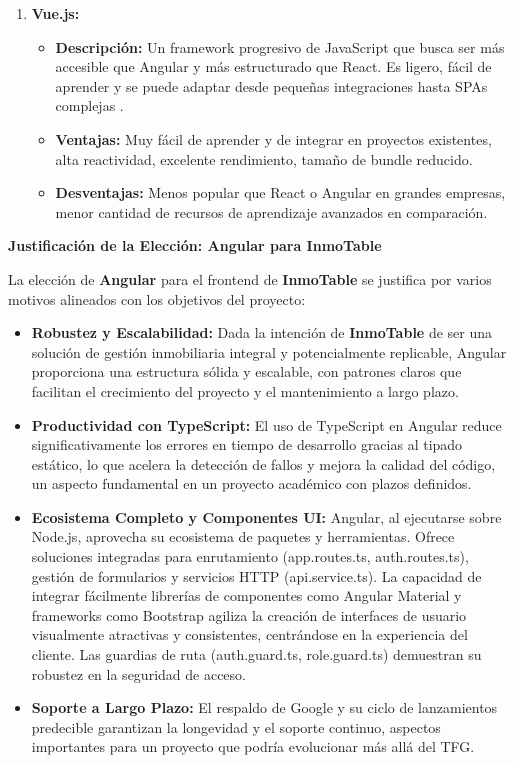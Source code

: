 \begin{enumerate}
    \item \textbf{Vue.js:}
    \begin{itemize}
        \item \textbf{Descripción:} Un framework progresivo de JavaScript que busca ser más accesible que Angular y más estructurado que React. Es ligero, fácil de aprender y se puede adaptar desde pequeñas integraciones hasta SPAs complejas \cite{hiberus2024angular}.
        \item \textbf{Ventajas:} Muy fácil de aprender y de integrar en proyectos existentes, alta reactividad, excelente rendimiento, tamaño de bundle reducido.
        \item \textbf{Desventajas:} Menos popular que React o Angular en grandes empresas, menor cantidad de recursos de aprendizaje avanzados en comparación.
    \end{itemize}

\end{enumerate}

\textbf{Justificación de la Elección: Angular para InmoTable}

La elección de \textbf{Angular} para el frontend de \textbf{InmoTable} se justifica por varios motivos alineados con los objetivos del proyecto:

\begin{itemize}
    \item \textbf{Robustez y Escalabilidad:} Dada la intención de \textbf{InmoTable} de ser una solución de gestión inmobiliaria integral y potencialmente replicable, Angular proporciona una estructura sólida y escalable, con patrones claros que facilitan el crecimiento del proyecto y el mantenimiento a largo plazo.
    \item \textbf{Productividad con TypeScript:} El uso de TypeScript en Angular reduce significativamente los errores en tiempo de desarrollo gracias al tipado estático, lo que acelera la detección de fallos y mejora la calidad del código, un aspecto fundamental en un proyecto académico con plazos definidos.
    \item \textbf{Ecosistema Completo y Componentes UI:} Angular, al ejecutarse sobre Node.js, aprovecha su ecosistema de paquetes y herramientas. Ofrece soluciones integradas para enrutamiento (app.routes.ts, auth.routes.ts), gestión de formularios y servicios HTTP (api.service.ts). La capacidad de integrar fácilmente librerías de componentes como Angular Material y frameworks como Bootstrap agiliza la creación de interfaces de usuario visualmente atractivas y consistentes, centrándose en la experiencia del cliente. Las guardias de ruta (auth.guard.ts, role.guard.ts) demuestran su robustez en la seguridad de acceso.
    \item \textbf{Soporte a Largo Plazo:} El respaldo de Google y su ciclo de lanzamientos predecible garantizan la longevidad y el soporte continuo, aspectos importantes para un proyecto que podría evolucionar más allá del TFG.
\end{itemize}


